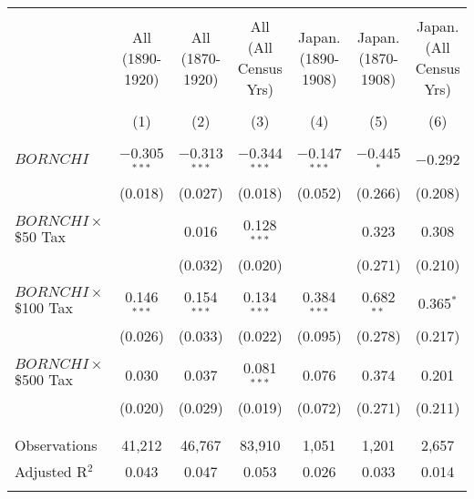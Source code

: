 
\begin{tabular}{@{\extracolsep{5pt}}lcccccc} 
\\[-1.8ex]\hline 
\hline \\[-1.8ex] 
 & All (1890-1920) & All (1870-1920) & All (All Census Yrs) & Japan. (1890-1908) & Japan. (1870-1908) & Japan. (All Census Yrs) \\ 
\\[-1.8ex] & (1) & (2) & (3) & (4) & (5) & (6)\\ 
\hline \\[-1.8ex] 
 $BORNCHI$ & $-$0.305$^{***}$ & $-$0.313$^{***}$ & $-$0.344$^{***}$ & $-$0.147$^{***}$ & $-$0.445$^{*}$ & $-$0.292 \\ 
  & (0.018) & (0.027) & (0.018) & (0.052) & (0.266) & (0.208) \\ 
  & & & & & & \\ 
 $BORNCHI \times$ \$50 Tax &  & 0.016 & 0.128$^{***}$ &  & 0.323 & 0.308 \\ 
  &  & (0.032) & (0.020) &  & (0.271) & (0.210) \\ 
  & & & & & & \\ 
 $BORNCHI \times$ \$100 Tax & 0.146$^{***}$ & 0.154$^{***}$ & 0.134$^{***}$ & 0.384$^{***}$ & 0.682$^{**}$ & 0.365$^{*}$ \\ 
  & (0.026) & (0.033) & (0.022) & (0.095) & (0.278) & (0.217) \\ 
  & & & & & & \\ 
 $BORNCHI \times$ \$500 Tax & 0.030 & 0.037 & 0.081$^{***}$ & 0.076 & 0.374 & 0.201 \\ 
  & (0.020) & (0.029) & (0.019) & (0.072) & (0.271) & (0.211) \\ 
  & & & & & & \\ 
\hline \\[-1.8ex] 
Observations & 41,212 & 46,767 & 83,910 & 1,051 & 1,201 & 2,657 \\ 
Adjusted R$^{2}$ & 0.043 & 0.047 & 0.053 & 0.026 & 0.033 & 0.014 \\ 
\hline \\[-1.8ex] 
\end{tabular} 
